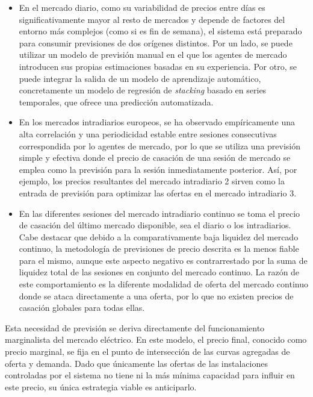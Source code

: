\begin{itemize}

  \item En el mercado diario, como su variabilidad de precios entre días es significativamente mayor al resto de mercados y depende de factores del entorno más complejos (como si es fin de semana), el sistema está preparado para consumir previsiones de dos orígenes distintos. Por un lado, se puede utilizar un modelo de previsión manual en el que los agentes de mercado introducen sus propias estimaciones basadas en su experiencia. Por otro, se puede integrar la salida de un modelo de aprendizaje automático, concretamente un modelo de regresión de \textit{stacking} basado en series temporales, que ofrece una predicción automatizada.

  \item En los mercados intradiarios europeos, se ha observado empíricamente una alta correlación y una periodicidad estable entre sesiones consecutivas correspondida por lo agentes de mercado, por lo que se utiliza una previsión simple y efectiva donde el precio de casación de una sesión de mercado se emplea como la previsión para la sesión inmediatamente posterior. Así, por ejemplo, los precios resultantes del mercado intradiario 2 sirven como la entrada de previsión para optimizar las ofertas en el mercado intradiario 3.

  \item En las diferentes sesiones del mercado intradiario continuo se toma el precio de casación del último mercado disponible, sea el diario o los intradiarios. Cabe destacar que debido a la comparativamente baja liquidez del mercado continuo, la metodología de previsiones de precio descrita es la menos fiable para el mismo, aunque este aspecto negativo es contrarrestado por la suma de liquidez total de las sesiones en conjunto del mercado continuo. La razón de este comportamiento es la diferente modalidad de oferta del mercado continuo donde se ataca directamente a una oferta, por lo que no existen precios de casación globales para todas ellas.

\end{itemize}

Esta necesidad de previsión se deriva directamente del funcionamiento marginalista del mercado eléctrico. En este modelo, el precio final, conocido como precio marginal, se fija en el punto de intersección de las curvas agregadas de oferta y demanda. Dado que únicamente las ofertas de las instalaciones controladas por el sistema no tiene ni la más mínima capacidad para influir en este precio, su única estrategia viable es anticiparlo.

